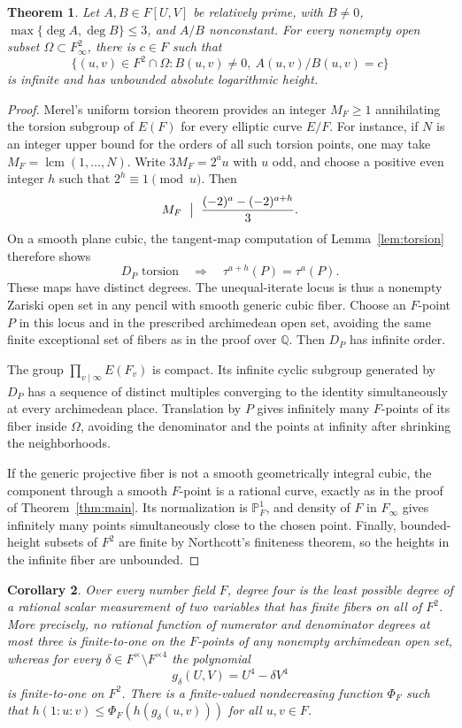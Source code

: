 \documentclass[11pt]{article}
\newtheorem{theorem}{Theorem}[section]
\newtheorem{corollary}[theorem]{Corollary}
\theoremstyle{remark}\newtheorem{remark}[theorem]{Remark}
\newcommand{\Q}{\mathbb Q}\newcommand{\R}{\mathbb R}
\newcommand{\PP}{\mathbb P}\newcommand{\Affine}{\mathbb A}
\begin{document}
\begin{theorem}\label{thm:numberfield}
Let $A,B\in F[U,V]$ be relatively prime, with $B\ne0$,
$\max\{\deg A,\deg B\}\le3$, and $A/B$ nonconstant.
For every nonempty open subset $\Omega\subset F_\infty^2$, there is
$c\in F$ such that
\[
\{(u,v)\in F^2\cap\Omega:B(u,v)\ne0,\ A(u,v)/B(u,v)=c\}
\]
is infinite and has unbounded absolute logarithmic height.
\end{theorem}

\begin{proof}
Merel's uniform torsion theorem \cite[Introduction, Corollary]{Merel}
provides an integer $M_F\ge1$ annihilating the torsion subgroup of
$E(F)$ for every elliptic curve $E/F$.  For instance, if $N$ is an
integer upper bound for the orders of all such torsion points, one
may take $M_F=\operatorname{lcm}(1,\ldots,N)$.
Write $3M_F=2^a u$ with $u$ odd, and choose a positive even integer
$h$ such that $2^h\equiv1\pmod u$.  Then
\[
M_F\ \bigm|\ \frac{(-2)^a-(-2)^{a+h}}3.
\]
On a smooth plane cubic, the tangent-map computation of
Lemma~\ref{lem:torsion} therefore shows
\[
D_P\text{ torsion}\quad\Longrightarrow\quad
\tau^{a+h}(P)=\tau^a(P).
\]
These maps have distinct degrees.  The unequal-iterate locus is thus
a nonempty Zariski open set in any pencil with smooth generic cubic
fiber.  Choose an $F$-point $P$ in this locus and in the prescribed
archimedean open set, avoiding the same finite exceptional set of
fibers as in the proof over $\Q$.  Then $D_P$ has infinite order.

The group $\prod_{v\mid\infty}E(F_v)$ is compact.  Its infinite cyclic
subgroup generated by $D_P$ has a sequence of distinct multiples
converging to the identity simultaneously at every archimedean
place.  Translation by $P$ gives infinitely many $F$-points of its
fiber inside $\Omega$, avoiding the denominator and the points at
infinity after shrinking the neighborhoods.

If the generic projective fiber is not a smooth geometrically
integral cubic, the component through a smooth $F$-point is a rational
curve, exactly as in the proof of Theorem~\ref{thm:main}.  Its
normalization is $\PP_F^1$, and density of $F$ in $F_\infty$ gives
infinitely many points simultaneously close to the chosen point.
Finally, bounded-height subsets of $F^2$ are finite by Northcott's
finiteness theorem, so the heights in the infinite fiber are unbounded.
\end{proof}

\begin{corollary}\label{cor:numberfieldsharp}
Over every number field $F$, degree four is the least possible degree
of a rational scalar measurement of two variables that has finite
fibers on all of $F^2$.  More precisely, no rational function of
numerator and denominator degrees at most three is finite-to-one on
the $F$-points of any nonempty archimedean open set, whereas for every
$\delta\in F^\times\setminus F^{\times4}$ the polynomial
\[
g_\delta(U,V)=U^4-\delta V^4
\]
is finite-to-one on $F^2$.
There is a finite-valued nondecreasing function $\Phi_F$ such that
$h(1:u:v)\le\Phi_F(h(g_\delta(u,v)))$ for all $u,v\in F$.
\end{corollary}
\end{document}

